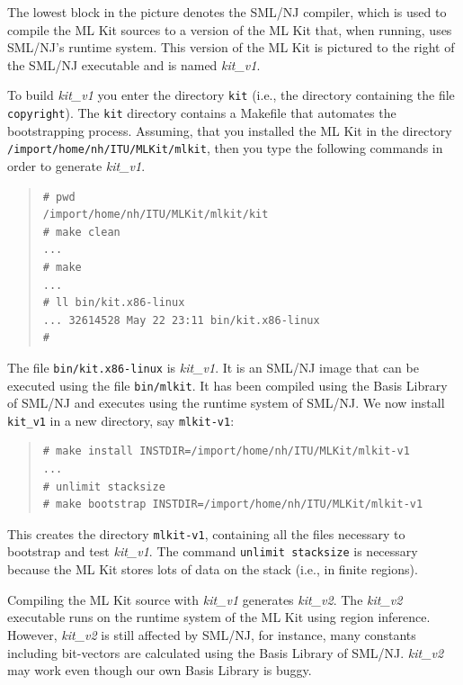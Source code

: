 \documentclass[12pt]{book}
\begin{document}
The lowest block in the picture denotes the SML/NJ compiler, which is
used to compile the ML Kit sources to a version of the ML Kit that,
when running, uses SML/NJ's runtime system. This version of the ML Kit
is pictured to the right of the SML/NJ executable and is named
\emph{kit\_v1}.

To build \emph{kit\_v1} you enter the directory \texttt{kit} (i.e.,
the directory containing the file \texttt{copyright}). The
\texttt{kit} directory contains a Makefile that automates the
bootstrapping process.  Assuming, that you installed the ML Kit in the
directory \texttt{/import/home/nh/ITU/MLKit/mlkit}, then you type the
following commands in order to generate \emph{kit\_v1}.

\begin{small}
\begin{quote}
\begin{verbatim}
# pwd
/import/home/nh/ITU/MLKit/mlkit/kit
# make clean
...
# make
...
# ll bin/kit.x86-linux 
... 32614528 May 22 23:11 bin/kit.x86-linux
# 
\end{verbatim}
\end{quote}
\end{small}

The file \texttt{bin/kit.x86-linux} is \emph{kit\_v1}. It is an SML/NJ
image that can be executed using the file \texttt{bin/mlkit}. It has
been compiled using the Basis Library of SML/NJ and executes using the
runtime system of SML/NJ. We now install \texttt{kit\_v1} in a new
directory, say \texttt{mlkit-v1}:

\begin{small}
\begin{quote}
\begin{verbatim}
# make install INSTDIR=/import/home/nh/ITU/MLKit/mlkit-v1
...
# unlimit stacksize
# make bootstrap INSTDIR=/import/home/nh/ITU/MLKit/mlkit-v1
\end{verbatim}
\end{quote}
\end{small}

This creates the directory \texttt{mlkit-v1}, containing all the files
necessary to bootstrap and test \emph{kit\_v1}. The command \texttt{unlimit
  stacksize} is necessary because the ML Kit stores lots of data on
the stack (i.e., in finite regions).

Compiling the ML Kit source with \emph{kit\_v1} generates
\emph{kit\_v2}. The \emph{kit\_v2} executable runs on the runtime
system of the ML Kit using region inference. However, \emph{kit\_v2}
is still affected by SML/NJ, for instance, many constants including
bit-vectors are calculated using the Basis Library of SML/NJ.
\emph{kit\_v2} may work even though our own Basis Library is buggy.
\end{document}
